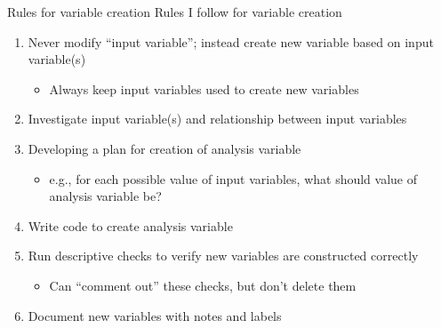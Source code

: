 \documentclass[
  8pt,
  ignorenonframetext,
  dvipsnames]{beamer}
\providecommand{\tightlist}{%
  \setlength{\itemsep}{0pt}\setlength{\parskip}{0pt}}
\let\olditem\item
\renewcommand{\item}{%
  \olditem\vspace{4pt}
}
\begin{document}
\begin{frame}{Rules for variable creation}
\protect\hypertarget{rules-for-variable-creation}{}
Rules I follow for variable creation

\begin{enumerate}
\tightlist
\item
  \medskip Never modify ``input variable''; instead create new variable
  based on input variable(s)

  \begin{itemize}
  \tightlist
  \item
    Always keep input variables used to create new variables
  \end{itemize}
\item
  Investigate input variable(s) and relationship between input variables
\item
  Developing a plan for creation of analysis variable

  \begin{itemize}
  \tightlist
  \item
    e.g., for each possible value of input variables, what should value
    of analysis variable be?
  \end{itemize}
\item
  Write code to create analysis variable
\item
  Run descriptive checks to verify new variables are constructed
  correctly

  \begin{itemize}
  \tightlist
  \item
    Can ``comment out'' these checks, but don't delete them
  \end{itemize}
\item
  Document new variables with notes and labels
\end{enumerate}
\end{frame}
\end{document}
